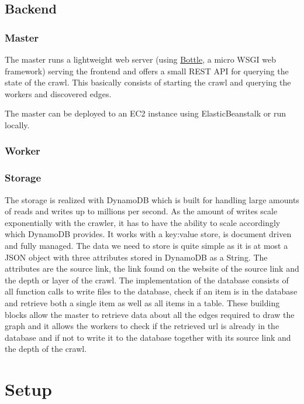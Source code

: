 \documentclass[english]{scrartcl}
\begin{document}
\subsection{Backend}

\subsubsection{Master}

The master runs a lightweight web server (using
\href{https://bottlepy.org/docs/dev/}{Bottle}, a micro WSGI web framework)
serving the frontend and offers a small REST API for querying the state of the
crawl. This basically consists of starting the crawl and querying the workers
and discovered edges.

The master can be deployed to an EC2 instance using ElasticBeanstalk or run
locally.

\subsubsection{Worker}

\subsubsection{Storage}
The storage is realized with DynamoDB which is built for handling large amounts of reads and writes up to millions per second.
As the amount of writes scale exponentially with the crawler, it has to have the ability to scale accordingly which DynamoDB provides.
It works with a key:value store, is document driven and fully managed.
The data we need to store is quite simple as it is at most a JSON object with three attributes stored in DynamoDB as a String. 
The attributes are the source link, the link found on the website of the source link and the depth or layer of the crawl.
The implementation of the database consists of all function calls to write files to the database, check if an item is in the database and
retrieve both a single item as well as all items in a table. These building blocks allow the master to retrieve data about all the edges
required to draw the graph and it allows the workers to check if the retrieved url is already in the database and if not to write it to the
database together with its source link and the depth of the crawl.

\section{Setup}
\end{document}
